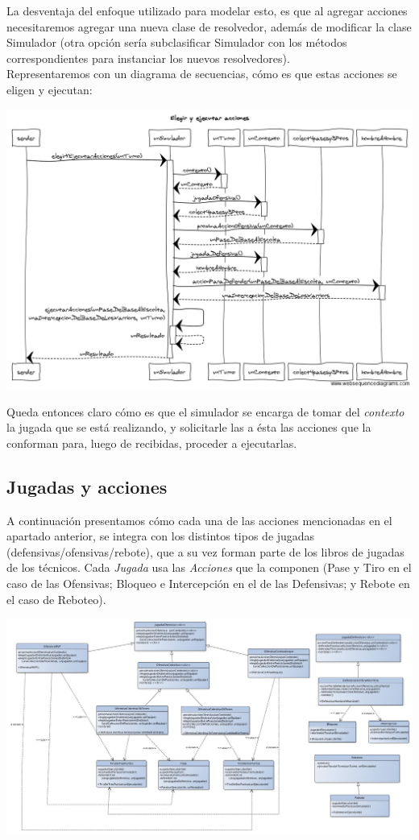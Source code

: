 La desventaja del enfoque utilizado para modelar esto, es que al agregar acciones necesitaremos agregar una nueva clase de resolvedor, además de modificar la clase Simulador (otra opción sería subclasificar Simulador con los métodos correspondientes para instanciar los nuevos resolvedores).\\


Representaremos con un diagrama de secuencias, cómo es que estas acciones se eligen y ejecutan:
\begin{center}
\includegraphics[scale=0.4]{diseno/Elegir_y_ejecutar_acciones.png}
\end{center}
Queda entonces claro cómo es que el simulador se encarga de tomar del \textit{contexto} la jugada que se está realizando, y solicitarle las a ésta las acciones que la conforman para, luego de recibidas, proceder a ejecutarlas.

\subsection{Jugadas y acciones}
A continuación presentamos cómo cada una de las acciones mencionadas en el apartado anterior, se integra con los distintos tipos de jugadas (defensivas/ofensivas/rebote), que a su vez forman parte de los libros de jugadas de los técnicos. Cada \textit{Jugada} usa las \textit{Acciones} que la componen (Pase y Tiro en el caso de las Ofensivas; Bloqueo e Intercepción en el de las Defensivas; y Rebote en el caso de Reboteo).

\begin{center}
\includegraphics[scale=0.4, angle=90]{diseno/jugadasYAcciones.jpg}
\end{center}

